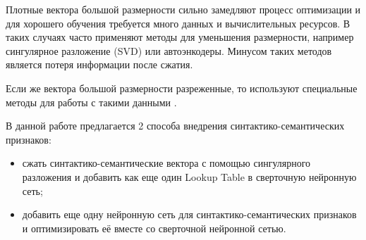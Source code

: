     Плотные вектора большой размерности сильно замедляют процесс оптимизации и для хорошего
    обучения требуется много данных и вычислительных ресурсов.
    В таких случаях часто применяют методы для уменьшения размерности,
    например сингулярное разложение (SVD) или автоэнкодеры. Минусом таких методов является потеря информации
    после сжатия.

    Если же вектора большой размерности разреженные, то используют специальные методы для
    работы с такими данными \citep{davissurvey}.

    В данной работе предлагается 2 способа внедрения синтактико-семантических признаков:
    \begin{itemize}
      \item сжать синтактико-семантические вектора с помощью сингулярного разложения и добавить
      как еще один Lookup Table в сверточную нейронную сеть;
      \item добавить еще одну нейронную сеть для синтактико-семантических признаков и оптимизировать
      её вместе со сверточной нейронной сетью.
    \end{itemize}
